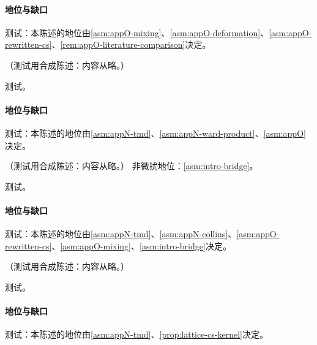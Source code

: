 \paragraph{地位与缺口}测试：本陈述的地位由\cref{asm:appO-mixing}、\cref{asm:appO-deformation}、\cref{asm:appO-rewritten-cs}、\cref{rem:appO-literature-comparison}决定。

\begin{proposition}\label{prop:tmd-h1h5}
（测试用合成陈述：内容从略。）
\end{proposition}
\begin{proofsketch}测试。\end{proofsketch}
\paragraph{地位与缺口}测试：本陈述的地位由\cref{asm:appN-tmd}、\cref{asm:appN-ward-product}、\cref{asm:appO}决定。

\begin{theorem}\label{thm:tmd-factorization}
（测试用合成陈述：内容从略。）
非微扰地位：\cref{asm:intro-bridge}。
\end{theorem}
\begin{proofsketch}测试。\end{proofsketch}
\paragraph{地位与缺口}测试：本陈述的地位由\cref{asm:appN-tmd}、\cref{asm:appN-collins}、\cref{asm:appO-rewritten-cs}、\cref{asm:appO-mixing}、\cref{asm:intro-bridge}决定。

\begin{proposition}\label{prop:tmd-evolution}
（测试用合成陈述：内容从略。）
\end{proposition}
\begin{proofsketch}测试。\end{proofsketch}
\paragraph{地位与缺口}测试：本陈述的地位由\cref{asm:appN-tmd}、\cref{prop:lattice-cs-kernel}决定。

